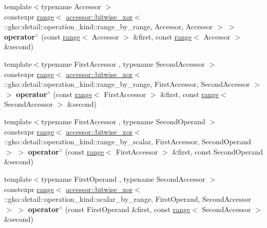 \begin{DoxyCompactItemize}
\item 
\mbox{\label{namespacegko_a9632339715461aa398490e01ff0061c1}} 
{\footnotesize template$<$typename Accessor $>$ }\\constexpr \hyperlink{classgko_1_1range}{range}$<$ \hyperlink{structgko_1_1accessor_1_1bitwise__xor}{accessor\+::bitwise\+\_\+xor}$<$ \+::gko\+::detail\+::operation\+\_\+kind\+::range\+\_\+by\+\_\+range, Accessor, Accessor $>$ $>$ {\bfseries operator$^\wedge$} (const \hyperlink{classgko_1_1range}{range}$<$ Accessor $>$ \&first, const \hyperlink{classgko_1_1range}{range}$<$ Accessor $>$ \&second)
\item 
\mbox{\label{namespacegko_aa283184871e7e3c2732eee8d5730a58f}} 
{\footnotesize template$<$typename First\+Accessor , typename Second\+Accessor $>$ }\\constexpr \hyperlink{classgko_1_1range}{range}$<$ \hyperlink{structgko_1_1accessor_1_1bitwise__xor}{accessor\+::bitwise\+\_\+xor}$<$ \+::gko\+::detail\+::operation\+\_\+kind\+::range\+\_\+by\+\_\+range, First\+Accessor, Second\+Accessor $>$ $>$ {\bfseries operator$^\wedge$} (const \hyperlink{classgko_1_1range}{range}$<$ First\+Accessor $>$ \&first, const \hyperlink{classgko_1_1range}{range}$<$ Second\+Accessor $>$ \&second)
\item 
\mbox{\label{namespacegko_afa4929c556ad4f2690b9c8aeaf2cea4f}} 
{\footnotesize template$<$typename First\+Accessor , typename Second\+Operand $>$ }\\constexpr \hyperlink{classgko_1_1range}{range}$<$ \hyperlink{structgko_1_1accessor_1_1bitwise__xor}{accessor\+::bitwise\+\_\+xor}$<$ \+::gko\+::detail\+::operation\+\_\+kind\+::range\+\_\+by\+\_\+scalar, First\+Accessor, Second\+Operand $>$ $>$ {\bfseries operator$^\wedge$} (const \hyperlink{classgko_1_1range}{range}$<$ First\+Accessor $>$ \&first, const Second\+Operand \&second)
\item 
\mbox{\label{namespacegko_a110b727befb8ac474ece75ac62ae6668}} 
{\footnotesize template$<$typename First\+Operand , typename Second\+Accessor $>$ }\\constexpr \hyperlink{classgko_1_1range}{range}$<$ \hyperlink{structgko_1_1accessor_1_1bitwise__xor}{accessor\+::bitwise\+\_\+xor}$<$ \+::gko\+::detail\+::operation\+\_\+kind\+::scalar\+\_\+by\+\_\+range, First\+Operand, Second\+Accessor $>$ $>$ {\bfseries operator$^\wedge$} (const First\+Operand \&first, const \hyperlink{classgko_1_1range}{range}$<$ Second\+Accessor $>$ \&second)

\end{DoxyCompactItemize}
